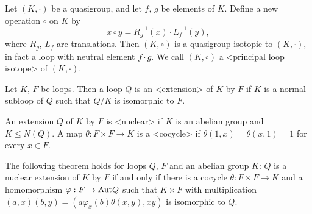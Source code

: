 Let $(K,\cdot)$ be a quasigroup, and let $f$, $g$ be elements of $K$. Define a
new operation $\circ$ on $K$ by
$$
    x\circ y = R_g^{-1}(x)\cdot L_f^{-1}(y),
$$
where $R_g$, $L_f$ are translations. Then $(K,\circ)$ is a quasigroup isotopic
to $(K,\cdot)$, in fact a loop with neutral element $f\cdot g$. We call
$(K,\circ)$ a <principal loop isotope>
%
%
 of $(K,\cdot)$.


Let $K$, $F$ be loops. Then a loop $Q$ is an <extension>
%
%
of $K$ by $F$ if $K$ is a normal subloop of $Q$ such that $Q/K$ is isomorphic
to $F$.

An extension $Q$ of $K$ by $F$ is <nuclear>
%
%
if $K$ is an abelian group and $K\le N(Q)$. A map $\theta:F\times F\to K$ is a
<cocycle>
%
%
if $\theta(1,x) = \theta(x,1) = 1$ for every $x\in F$.

The following theorem holds for loops $Q$, $F$ and an abelian group $K$: $Q$ is
a nuclear extension of $K$ by $F$ if and only if there is a cocycle
$\theta:F\times F\to K$ and a homomorphism $\varphi:F\to{\rm{Aut}}{Q}$ such
that $K\times F$ with multiplication $(a,x)(b,y) =
(a\varphi_x(b)\theta(x,y),xy)$ is isomorphic to $Q$.
